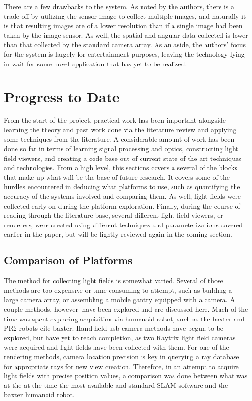 \documentclass[12pt]{report}
\begin{document}
There are a few drawbacks to the system. As noted by the authors, there is a trade-off by utilizing the sensor image to collect multiple images, and naturally it is that resulting images are of a lower resolution than if a single image had been taken by the image sensor. As well, the spatial and angular data collected is lower than that collected by the standard camera array. As an aside, the authors' focus for the system is largely for entertainment purposes, leaving the technology lying in wait for some novel application that has yet to be realized.

\chapter{Progress to Date}
From the start of the project, practical work has been important alongside learning the theory and past work done via the literature review and applying some techniques from the literature. A considerable amount of work has been done so far in terms of learning signal processing and optics, constructing light field viewers, and creating a code base out of current state of the art techniques and technologies. From a high level, this sections covers a several of the blocks that make up what will be the base of future research. It covers some of the hurdles encountered in deducing what platforms to use, such as quantifying the accuracy of the systems involved and comparing them. As well, light fields were collected early on during the platform exploration. Finally, during the course of reading through the literature base, several different light field viewers, or renderers, were created using different techniques and parameterizations covered earlier in the paper, but will be lightly reviewed again in the coming section.

\section{Comparison of Platforms}
The method for collecting light fields is somewhat varied. Several of those methods are too expensive or time consuming to attempt, such as building a large camera array, or assembling a mobile gantry equipped with a camera. A couple methods, however, have been explored and are discussed here. Much of the time was spent exploring acquisition via humanoid robot, such as the baxter and PR2 robots cite baxter. Hand-held usb camera methods have begun to be explored, but have yet to reach completion, as two Raytrix light field cameras were acquired and light fields have been collected with them. For one of the rendering methods, camera location precision is key in querying a ray database for appropriate rays for new view creation. Therefore, in an attempt to acquire light fields with precise position values, a comparison was done between what was at the at the time the most available and standard SLAM software and the baxter humanoid robot. 
\end{document}
